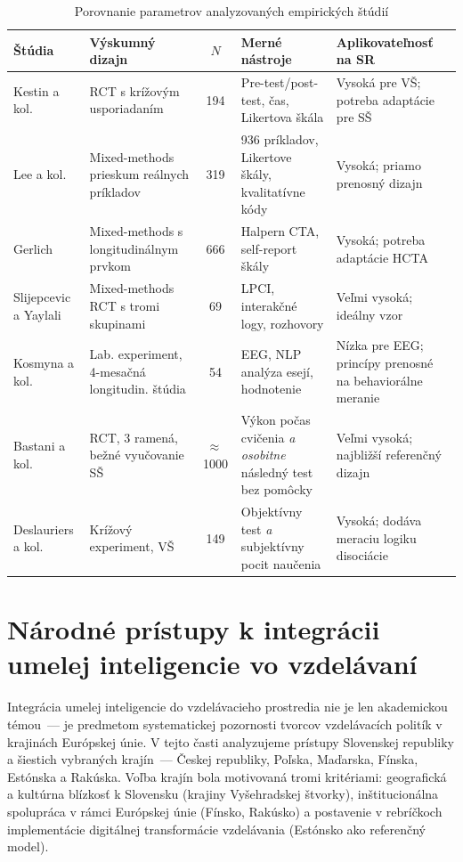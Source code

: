 \begin{table}[H]
\centering
\caption{Porovnanie parametrov analyzovaných empirických štúdií}
\label{tab:metodologie}
\small
\begin{tabularx}{\textwidth}{|l|X|c|X|X|}
\hline
\textbf{Štúdia} & \textbf{Výskumný dizajn} & \textbf{$N$} & \textbf{Merné nástroje} & \textbf{Aplikovateľnosť na SR} \\
\hline
Kestin a kol. & RCT s krížovým usporiadaním & 194 & Pre-test/post-test, čas, Likertova škála & Vysoká pre VŠ; potreba adaptácie pre SŠ \\
\hline
Lee a kol. & Mixed-methods prieskum reálnych príkladov & 319 & 936 príkladov, Likertove škály, kvalitatívne kódy & Vysoká; priamo prenosný dizajn \\
\hline
Gerlich & Mixed-methods s longitudinálnym prvkom & 666 & Halpern CTA, self-report škály & Vysoká; potreba adaptácie HCTA \\
\hline
Slijepcevic a Yaylali & Mixed-methods RCT s tromi skupinami & 69 & LPCI, interakčné logy, rozhovory & Veľmi vysoká; ideálny vzor \\
\hline
Kosmyna a kol. & Lab. experiment, 4-mesačná longitudin. štúdia & 54 & EEG, NLP analýza esejí, hodnotenie & Nízka pre EEG; princípy prenosné na behaviorálne meranie \\
\hline
Bastani a kol. & RCT, 3 ramená, bežné vyučovanie SŠ & $\approx$\,1000 & Výkon počas cvičenia \emph{a osobitne} následný test bez pomôcky & Veľmi vysoká; najbližší referenčný dizajn \\
\hline
Deslauriers a kol. & Krížový experiment, VŠ & 149 & Objektívny test \emph{a} subjektívny pocit naučenia & Vysoká; dodáva meraciu logiku disociácie \\
\hline
\end{tabularx}
\end{table}


\section{Národné prístupy k integrácii umelej inteligencie vo vzdelávaní}
\label{sec:krajiny}

Integrácia umelej inteligencie do vzdelávacieho prostredia nie je len akademickou témou~--- je predmetom systematickej pozornosti tvorcov vzdelávacích politík v krajinách Európskej únie. V tejto časti analyzujeme prístupy Slovenskej republiky a šiestich vybraných krajín~--- Českej republiky, Poľska, Maďarska, Fínska, Estónska a Rakúska. Voľba krajín bola motivovaná tromi kritériami: geografická a kultúrna blízkosť k Slovensku (krajiny Vyšehradskej štvorky), inštitucionálna spolupráca v rámci Európskej únie (Fínsko, Rakúsko) a postavenie v rebríčkoch implementácie digitálnej transformácie vzdelávania (Estónsko ako referenčný model).


